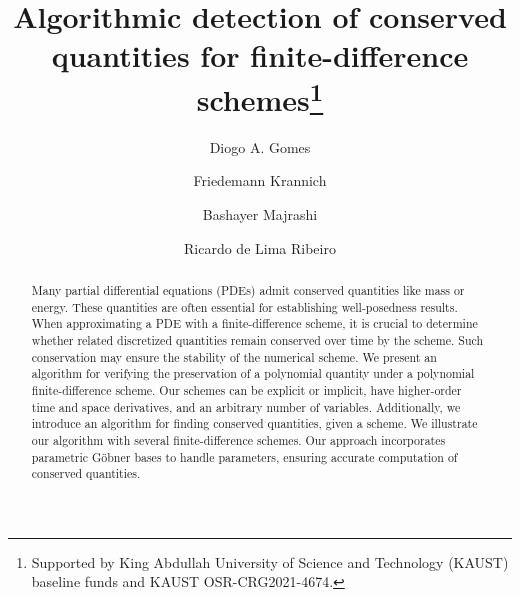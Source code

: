 \documentclass[runningheads]{llncs}
\newcommand{\1}{\chi}
\begin{document}
%
\title{Algorithmic detection of conserved quantities for finite-difference schemes\thanks{Supported by King Abdullah University of Science and Technology (KAUST) baseline funds and KAUST OSR-CRG2021-4674.}}
%
%
\author{Diogo A. Gomes \and
	Friedemann Krannich \and
	Bashayer Majrashi \and
	Ricardo de Lima Ribeiro}
%
%
%
\maketitle
%
\begin{abstract}
	Many partial differential equations (PDEs) admit conserved quantities like mass or energy. These quantities are often essential for establishing well-posedness results. When approximating a PDE with a finite-difference scheme, it is crucial to determine whether related discretized quantities remain conserved over time by the scheme. Such conservation may ensure the stability of the numerical scheme. We present an algorithm for verifying the preservation of a polynomial quantity under a polynomial finite-difference scheme. Our schemes can be explicit or implicit, have higher-order time and space derivatives, and an arbitrary number of variables. Additionally, we introduce an algorithm for finding conserved quantities, given a scheme. We illustrate our algorithm with several finite-difference schemes. Our approach incorporates parametric G\"obner bases to handle parameters, ensuring accurate computation of conserved quantities.
	
	
\end{abstract}
\end{document}
